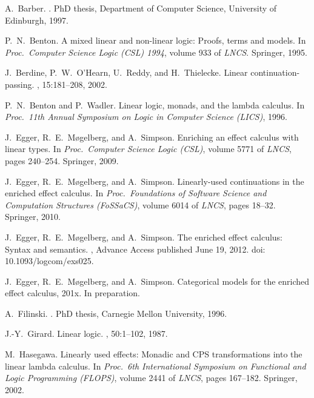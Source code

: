 \documentclass{LMCS}
\begin{document}
\begin{thebibliography}{BORT02}

A.\ Barber.
.
\newblock PhD thesis, Department of Computer Science, University of Edinburgh,
  1997.

P.~N.\ Benton.
\newblock A mixed linear and non-linear logic: Proofs, terms and models.
\newblock In {\em Proc.\ Computer Science Logic (CSL) 1994}, volume 933 of {\em
  LNCS}. Springer, 1995.

J.\ Berdine, P.~W.\ O'Hearn, U.\ Reddy, and H.\ Thielecke.
\newblock Linear continuation-passing.
, 15:181--208, 2002.

P.~N.\ Benton and P.\ Wadler.
\newblock Linear logic, monads, and the lambda calculus.
\newblock In {\em Proc.\ 11th Annual Symposium on Logic in Computer Science
  (LICS)}, 1996.

J.\ Egger, R.~E.\ M{\o}gelberg, and A.\ Simpson.
\newblock Enriching an effect calculus with linear types.
\newblock In {\em Proc.\ Computer Science Logic (CSL)}, volume 5771 of {\em
  LNCS}, pages 240--254. Springer, 2009.

J.\ Egger, R.~E.\ M{\o}gelberg, and A.\ Simpson.
\newblock Linearly-used continuations in the enriched effect calculus.
\newblock In {\em Proc.\ Foundations of Software Science and Computation
  Structures (FoSSaCS)}, volume 6014 of {\em LNCS}, pages 18--32. Springer,
  2010.

J.\ Egger, R.~E.\ M{\o}gelberg, and A.\ Simpson.
\newblock The enriched effect calculus: Syntax and semantics.
, Advance Access published June
  19, 2012.
\newblock doi: {10.1093/logcom/exs025}.

J.\ Egger, R.~E.\ M{\o}gelberg, and A.\ Simpson.
\newblock Categorical models for the enriched effect calculus, 201x.
\newblock In preparation.

A.\ Filinski.
.
\newblock PhD thesis, Carnegie Mellon University, 1996.

J.-Y.\ Girard.
\newblock Linear logic.
, 50:1--102, 1987.

M.\ Hasegawa.
\newblock Linearly used effects: Monadic and {CPS} transformations into the
  linear lambda calculus.
\newblock In {\em Proc.\ 6th International Symposium on Functional and Logic
  Programming (FLOPS)}, volume 2441 of {\em LNCS}, pages 167--182. Springer,
  2002.


\end{thebibliography}
\end{document}
